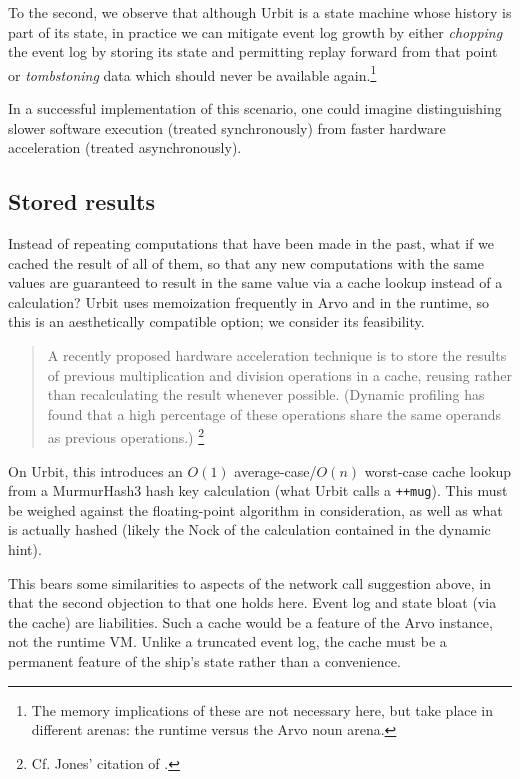 \documentclass[twoside]{article}
\begin{document}
To the second, we observe that although Urbit is a state machine whose history is part of its state, in practice we can mitigate event log growth by either \emph{chopping} the event log by storing its state and permitting replay forward from that point or \emph{tombstoning} data which should never be available again.\footnote{The memory implications of these are not necessary here, but take place in different arenas:  the runtime versus the Arvo noun arena.}

In a successful implementation of this scenario, one could imagine distinguishing slower software execution (treated synchronously) from faster hardware acceleration (treated asynchronously).

\subsection{Stored results}
\label{stored-results}

Instead of repeating computations that have been made in the past, what if we cached the result of all of them, so that any new computations with the same values are guaranteed to result in the same value via a cache lookup instead of a calculation?  Urbit uses memoization frequently in Arvo and in the runtime, so this is an aesthetically compatible option; we consider its feasibility.

\begin{quote}
A recently proposed hardware acceleration technique is to store the results of previous multiplication and division operations in a cache, reusing rather than recalculating the result whenever possible. (Dynamic profiling has found that a high percentage of these operations share the same operands as previous operations.)  \citetext{\citet{Jones2008}, p.~1148}\footnote{Cf. Jones' citation of \citeauthor{Citron1998}.}
\end{quote}

On Urbit, this introduces an $O(1)$ average-case/$O(n)$ worst-case cache lookup from a MurmurHash3 hash key calculation (what Urbit calls a \lstinline[style=inlinecode]{++mug}).  This must be weighed against the floating-point algorithm in consideration, as well as what is actually hashed (likely the Nock of the calculation contained in the dynamic hint).

This bears some similarities to aspects of the network call suggestion above, in that the second objection to that one holds here.  Event log and state bloat (via the cache) are liabilities.  Such a cache would be a feature of the Arvo instance, not the runtime VM.  Unlike a truncated event log, the cache must be a permanent feature of the ship's state rather than a convenience.
\end{document}
